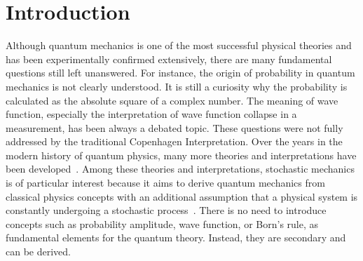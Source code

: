 \documentclass[%
 aip, 
 amsmath,amssymb,amsthm,
 nofootinbib,
 reprint,
]{revtex4-1}
\begin{document}
\section{Introduction}
\label{intro}
Although quantum mechanics is one of the most successful physical theories and has been experimentally confirmed extensively, there are many fundamental questions still left unanswered. For instance, the origin of probability in quantum mechanics is not clearly understood. It is still a curiosity why the probability is calculated as the absolute square of a complex number. The meaning of wave function, especially the interpretation of wave function collapse in a measurement, has been always a debated topic. These questions were not fully addressed by the traditional Copenhagen Interpretation. Over the years in the modern history of quantum physics, many more theories and interpretations have been developed~\cite{Stanford, Jammer74}. %
Among these theories and interpretations, stochastic mechanics is of particular interest because it aims to derive quantum mechanics from classical physics concepts with an additional assumption that a physical system is constantly undergoing a stochastic process~\cite{Goldstein, Nelson2}. There is no need to introduce concepts such as probability amplitude, wave function, or Born's rule, as fundamental elements for the quantum theory. Instead, they are secondary and can be derived. 
\end{document}
